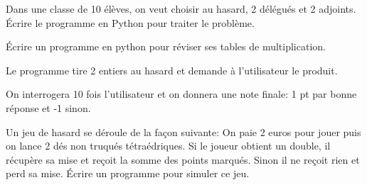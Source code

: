 \documentclass[a4paper,11pt]{article}
\begin{document}
\begin{Form}
\begin{exo}
Dans une classe de 10 élèves, on veut choisir au hasard, 2 délégués et 2 adjoints.
Écrire le programme en Python pour traiter le problème.
\end{exo}
\begin{exo}
Écrire un programme en python pour réviser ses tables de multiplication.

Le programme tire 2 entiers au hasard et demande à l'utilisateur le produit.

On interrogera 10 fois l'utilisateur et on donnera une note finale: 1 pt par bonne réponse et -1 sinon. 
\end{exo}
\begin{exo}
Un jeu de hasard se déroule de la façon suivante: On paie 2 euros pour jouer puis on lance 2 dés non truqués tétraédriques.
Si le joueur obtient un double, il récupère sa mise et reçoit la somme des points marqués.
Sinon il ne reçoit rien et perd sa mise. Écrire un programme pour simuler ce jeu. 
\end{exo}
\end{Form}
\end{document}
